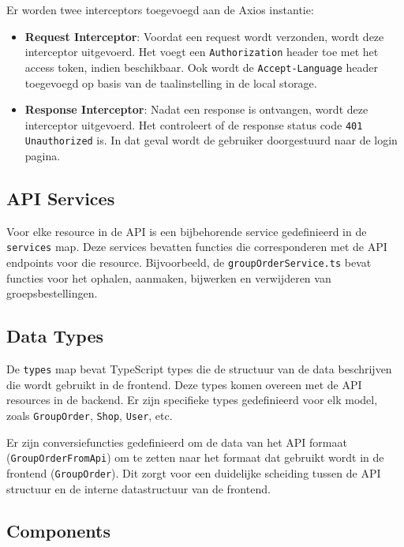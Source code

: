 Er worden twee interceptors toegevoegd aan de Axios instantie:

\begin{itemize}
\item \textbf{Request Interceptor}: Voordat een request wordt verzonden, wordt deze interceptor uitgevoerd. Het voegt een \texttt{Authorization} header toe met het access token, indien beschikbaar. Ook wordt de \texttt{Accept-Language} header toegevoegd op basis van de taalinstelling in de local storage.
\item \textbf{Response Interceptor}: Nadat een response is ontvangen, wordt deze interceptor uitgevoerd. Het controleert of de response status code \texttt{401 Unauthorized} is. In dat geval wordt de gebruiker doorgestuurd naar de login pagina.
\end{itemize}

\subsection{API Services}

Voor elke resource in de API is een bijbehorende service gedefinieerd in de \texttt{services} map. Deze services bevatten functies die corresponderen met de API endpoints voor die resource. Bijvoorbeeld, de \texttt{groupOrderService.ts} bevat functies voor het ophalen, aanmaken, bijwerken en verwijderen van groepsbestellingen.

\subsection{Data Types}

De \texttt{types} map bevat TypeScript types die de structuur van de data beschrijven die wordt gebruikt in de frontend. Deze types komen overeen met de API resources in de backend. Er zijn specifieke types gedefinieerd voor elk model, zoals \texttt{GroupOrder}, \texttt{Shop}, \texttt{User}, etc.

Er zijn conversiefuncties gedefinieerd om de data van het API formaat (\texttt{GroupOrderFromApi}) om te zetten naar het formaat dat gebruikt wordt in de frontend (\texttt{GroupOrder}). Dit zorgt voor een duidelijke scheiding tussen de API structuur en de interne datastructuur van de frontend.

\subsection{Components}

